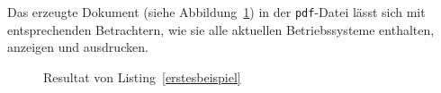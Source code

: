 Das erzeugte Dokument (siehe Abbildung~\ref{fig_Listing1}) in der \verb!pdf!-Datei lässt sich mit entsprechenden Betrachtern, wie sie alle aktuellen Betriebssysteme enthalten, anzeigen und ausdrucken.


\begin{figure}[H]
    \caption{Resultat von Listing~\ref{erstesbeispiel}}
    \label{fig_Listing1}
\end{figure}
